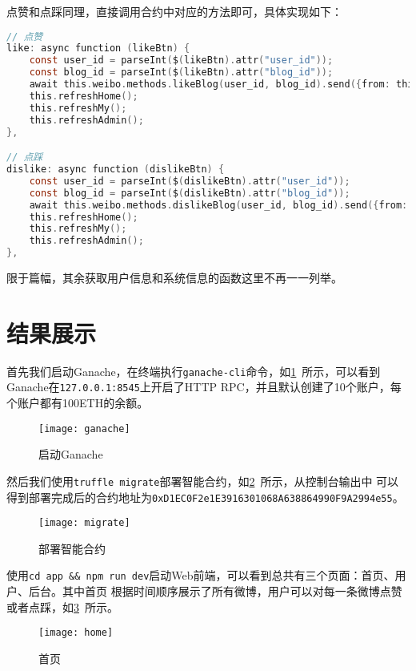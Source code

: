 \documentclass[bwprint]{hfutreport}
\begin{document}
点赞和点踩同理，直接调用合约中对应的方法即可，具体实现如下：
\begin{lstlisting}[language=c]
// 点赞
like: async function (likeBtn) {
    const user_id = parseInt($(likeBtn).attr("user_id"));
    const blog_id = parseInt($(likeBtn).attr("blog_id"));
    await this.weibo.methods.likeBlog(user_id, blog_id).send({from: this.account});
    this.refreshHome();
    this.refreshMy();
    this.refreshAdmin();
},

// 点踩
dislike: async function (dislikeBtn) {
    const user_id = parseInt($(dislikeBtn).attr("user_id"));
    const blog_id = parseInt($(dislikeBtn).attr("blog_id"));
    await this.weibo.methods.dislikeBlog(user_id, blog_id).send({from: this.account});
    this.refreshHome();
    this.refreshMy();
    this.refreshAdmin();
},
\end{lstlisting}

限于篇幅，其余获取用户信息和系统信息的函数这里不再一一列举。

\section{结果展示}
首先我们启动Ganache，在终端执行\verb|ganache-cli|命令，如\cref{fig:ganache}~所示，可以看到
Ganache在\verb|127.0.0.1:8545|上开启了HTTP RPC，并且默认创建了10个账户，每个账户都有100ETH的余额。

\begin{figure}[!htbp]
    \texttt{[image: ganache]}
    \caption{启动Ganache}
    \label{fig:ganache}
\end{figure}

然后我们使用\verb|truffle migrate|部署智能合约，如\cref{fig:migrate}~所示，从控制台输出中
可以得到部署完成后的合约地址为\verb|0xD1EC0F2e1E3916301068A638864990F9A2994e55|。

\begin{figure}[!htbp]
    \texttt{[image: migrate]}
    \caption{部署智能合约}
    \label{fig:migrate}
\end{figure}

使用\verb|cd app && npm run dev|启动Web前端，可以看到总共有三个页面：首页、用户、后台。其中首页
根据时间顺序展示了所有微博，用户可以对每一条微博点赞或者点踩，如\cref{fig:home}~所示。

\begin{figure}[!htbp]
    \centering
    \texttt{[image: home]}
    \caption{首页}
    \label{fig:home}
\end{figure}
\end{document}
